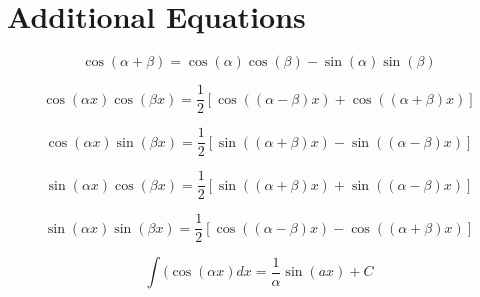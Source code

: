\documentclass[12pt]{article}
\begin{document}
\newpage
\section{Additional Equations}%

\begin{equation}
\label{cos a+b additional}
\cos(\alpha + \beta) = \cos (\alpha) \cos(\beta) - \sin ( \alpha) \sin (\beta)
\end{equation}

\begin{equation}
\label{cos cos additional}
\cos(\alpha x)\cos(\beta x) = \frac{1}{2}[\cos((\alpha-\beta)x) + \cos((\alpha+\beta)x)]
\end{equation}

\begin{equation}
\label{cos sin additional}
\cos(\alpha x)\sin(\beta x) = \frac{1}{2}[\sin((\alpha+\beta)x) - \sin((\alpha-\beta)x)]
\end{equation}

\begin{equation}
\label{sin cos additional}
\sin(\alpha x)\cos(\beta x) = \frac{1}{2}[\sin((\alpha +\beta)x) + \sin((\alpha -\beta)x)]
\end{equation}

\begin{equation}
\label{sin sin additional}
\sin(\alpha x)\sin(\beta x) = \frac{1}{2}[\cos((\alpha -\beta)x) - \cos((\alpha +\beta)x)]
\end{equation}

\begin{equation}
\label{integral cos}
\int (\cos(\alpha x)dx = \frac{1}{\alpha}\sin(ax) + C
\end{equation}
\end{document}
